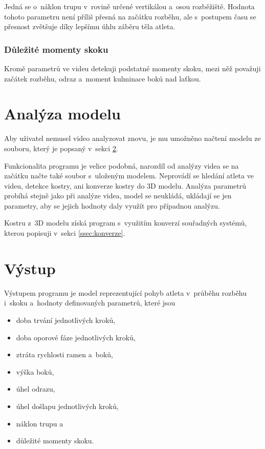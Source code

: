 Jedná se o~náklon trupu v~rovině určené vertikálou a~osou rozběžiště. Hodnota tohoto parametru není příliš přesná na začátku rozběhu, ale s~postupem času se přesnost zvětšuje díky lepšímu úhlu záběru těla atleta.


\subsubsection{Důležité momenty skoku}

Kromě parametrů ve videu detekuji podstatné momenty skoku, mezi něž považuji začátek rozběhu, odraz a~moment kulminace boků nad laťkou.




\section{Analýza modelu}

Aby uživatel nemusel video analyzovat znovu, je mu umožněno načtení modelu ze souboru, který je popsaný v~sekci \ref{sec:vystup}.

Funkcionalita programu je velice podobná, narozdíl od analýzy videa se na začátku načte také soubor s~uloženým modelem. Neprovádí se hledání atleta ve videu, detekce kostry, ani konverze kostry do 3D modelu. Analýza parametrů probíhá stejně jako při analýze videa, model se neukládá, ukládají se jen parametry, aby se jejich hodnoty daly využít pro případnou analýzu.

Kostru z~3D modelu získá program s~využitím konverzí souřadných systémů, kterou popisuji v~sekci \ref{ssec:konverze}.




\section{Výstup}
\label{sec:vystup}

Výstupem programu je model reprezentující pohyb atleta v~průběhu rozběhu i~skoku a~hodnoty definovaných parametrů, které jsou
\begin{itemize}
\item doba trvání jednotlivých kroků,
\item doba oporové fáze jednotlivých kroků,
\item ztráta rychlosti ramen a~boků,
\item výška boků,
\item úhel odrazu,
\item úhel došlapu jednotlivých kroků,
\item náklon trupu a
\item důležité momenty skoku.
\end{itemize}


